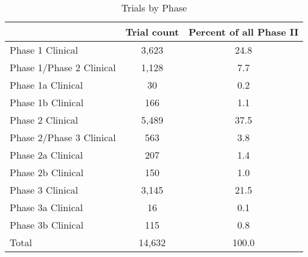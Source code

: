 \begin{table}[htbp]\centering
\def\sym#1{\ifmmode^{#1}\else\(^{#1}\)\fi}
\caption{Trials by Phase}
\begin{tabular}{l*{1}{cc}}
\hline\hline
          &Trial count&Percent of all Phase II\\
\hline
Phase 1 Clinical&    3,623&     24.8\\
Phase 1/Phase 2 Clinical&    1,128&      7.7\\
Phase 1a Clinical&       30&      0.2\\
Phase 1b Clinical&      166&      1.1\\
Phase 2 Clinical&    5,489&     37.5\\
Phase 2/Phase 3 Clinical&      563&      3.8\\
Phase 2a Clinical&      207&      1.4\\
Phase 2b Clinical&      150&      1.0\\
Phase 3 Clinical&    3,145&     21.5\\
Phase 3a Clinical&       16&      0.1\\
Phase 3b Clinical&      115&      0.8\\
Total     &   14,632&    100.0\\
\hline\hline
\end{tabular}
\end{table}
